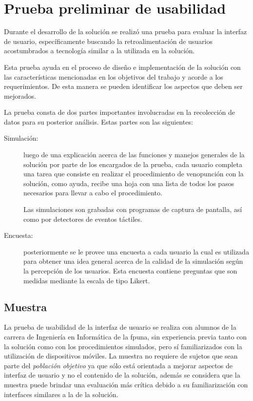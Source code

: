 \section{Prueba preliminar de usabilidad}
\label{sec:interfaz}

Durante el desarrollo de la solución se realizó una prueba para evaluar la 
interfaz de usuario, específicamente buscando la retroalimentación de usuarios 
acostumbrados a tecnología similar a la utilizada en la solución.

Esta prueba ayuda en el proceso de diseño e implementación de la solución con 
las características mencionadas en los objetivos del trabajo y acorde a los 
requerimientos. De esta manera se pueden identificar los aspectos que deben 
ser mejorados.

La prueba consta de dos partes importantes involucradas en la recolección
de datos para su posterior análisis. Estas partes son las siguientes:

\begin{description}

\item[Simulación:] luego de una explicación acerca de las funciones y manejos
    generales de la solución por parte de los encargados de la prueba, cada usuario
    completa una tarea que consiste en realizar el procedimiento de venopunción con la 
    solución, como ayuda, recibe una hoja con una lista de todos los pasos 
    necesarios para llevar a cabo el procedimiento.
    	
    Las simulaciones son grabadas con programas de captura de pantalla, así
    como por detectores de eventos táctiles.
    	
\item[Encuesta:] posteriormente se le provee una encuesta a cada
    usuario la cual es utilizada para obtener una idea general acerca de la
    calidad de la simulación según la percepción de los usuarios. Esta encuesta 
    contiene preguntas que son medidas mediante la escala de tipo Likert. 

\end{description} 

\subsection{Muestra}

La prueba de usabilidad de la interfaz de usuario se realiza con alumnos de la
carrera de Ingeniería en Informática de la \Gls{fpuna}, sin experiencia previa
tanto con la solución como con los procedimientos simulados, pero sí
familiarizados con la utilización de dispositivos móviles. La muestra no
requiere de sujetos que sean parte del \emph{población objetivo} ya que sólo
está orientada a mejorar aspectos de interfaz de usuario y no el contenido de la
solución, además se considera que la muestra puede brindar una evaluación más
crítica debido a su familiarización con interfaces similares a la de la
solución.

